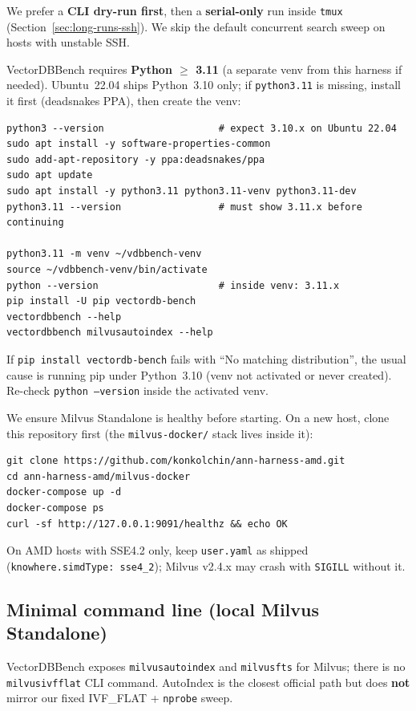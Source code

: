 \documentclass[11pt,a4paper]{article}
\begin{document}
We prefer a \textbf{CLI dry-run first}, then a \textbf{serial-only} run inside \texttt{tmux}
(Section~\ref{sec:long-runs-ssh}). We skip the default concurrent search sweep on hosts with
unstable SSH.

VectorDBBench requires \textbf{Python $\geq$ 3.11} (a separate venv from this harness if
needed). Ubuntu~22.04 ships Python~3.10 only; if \texttt{python3.11} is missing, install it
first (deadsnakes PPA), then create the venv:
\begin{verbatim}
python3 --version                    # expect 3.10.x on Ubuntu 22.04
sudo apt install -y software-properties-common
sudo add-apt-repository -y ppa:deadsnakes/ppa
sudo apt update
sudo apt install -y python3.11 python3.11-venv python3.11-dev
python3.11 --version                 # must show 3.11.x before continuing

python3.11 -m venv ~/vdbbench-venv
source ~/vdbbench-venv/bin/activate
python --version                     # inside venv: 3.11.x
pip install -U pip vectordb-bench
vectordbbench --help
vectordbbench milvusautoindex --help
\end{verbatim}

If \texttt{pip install vectordb-bench} fails with ``No matching distribution'', the usual
cause is running pip under Python~3.10 (venv not activated or never created). Re-check
\texttt{python --version} inside the activated venv.

We ensure Milvus Standalone is healthy before starting. On a new host, clone this
repository first (the \texttt{milvus-docker/} stack lives inside it):
\begin{verbatim}
git clone https://github.com/konkolchin/ann-harness-amd.git
cd ann-harness-amd/milvus-docker
docker-compose up -d
docker-compose ps
curl -sf http://127.0.0.1:9091/healthz && echo OK
\end{verbatim}

On AMD hosts with SSE4.2 only, keep \texttt{user.yaml} as shipped
(\texttt{knowhere.simdType: sse4\_2}); Milvus v2.4.x may crash with \texttt{SIGILL}
without it.

\subsection{Minimal command line (local Milvus Standalone)}

VectorDBBench exposes \texttt{milvusautoindex} and \texttt{milvusfts} for Milvus;
there is no \texttt{milvusivfflat} CLI command. AutoIndex is the closest official path
but does \textbf{not} mirror our fixed IVF\_FLAT{} + \texttt{nprobe} sweep.
\end{document}
